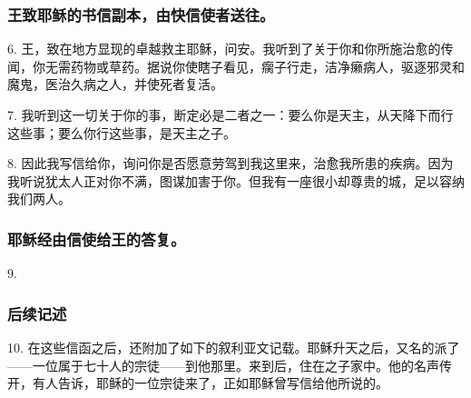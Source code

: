 
\subsubsection{王致耶稣的书信副本，由快信使者送往。}

6. 王，致在地方显现的卓越救主耶稣，问安。我听到了关于你和你所施治愈的传闻，你无需药物或草药。据说你使瞎子看见，瘸子行走，洁净癞病人，驱逐邪灵和魔鬼，医治久病之人，并使死者复活。\par

7. 我听到这一切关于你的事，断定必是二者之一：要么你是天主，从天降下而行这些事；要么你行这些事，是天主之子。\par

8. 因此我写信给你，询问你是否愿意劳驾到我这里来，治愈我所患的疾病。因为我听说犹太人正对你不满，图谋加害于你。但我有一座很小却尊贵的城，足以容纳我们两人。\par


\subsubsection{耶稣经由信使给王的答复。}

9. \par


\subsubsection{后续记述}

10. 在这些信函之后，还附加了如下的叙利亚文记载。耶稣升天之后，又名的派了——一位属于七十人的宗徒——到他那里。来到后，住在之子家中。他的名声传开，有人告诉，耶稣的一位宗徒来了，正如耶稣曾写信给他所说的。\par

